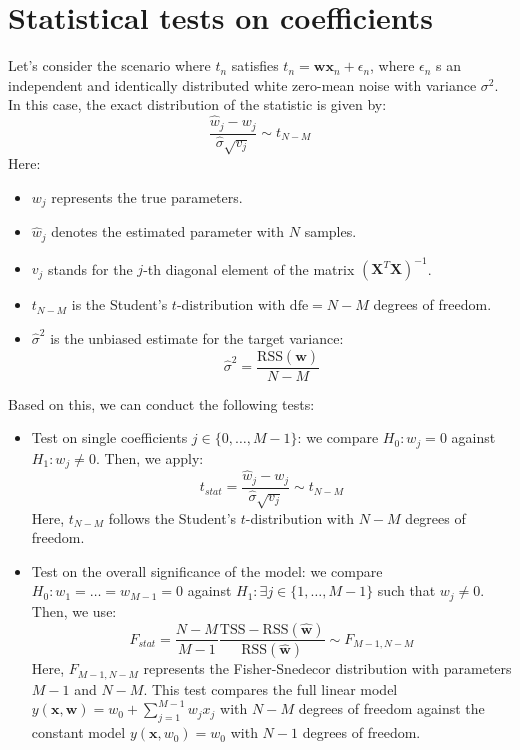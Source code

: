 \section{Statistical tests on coefficients}

Let's consider the scenario where $t_n$ satisfies $t_n=\textbf{w}\textbf{x}_n+\epsilon_n$, where $\epsilon_n$ s an independent and identically distributed white zero-mean noise with variance $\sigma^2$. 
In this case, the exact distribution of the statistic is given by:
\[\dfrac{\hat{w}_j-w_j}{\hat{\sigma}\sqrt{v_j}}\sim t_{N-M}\]
Here: 
\begin{itemize}
    \item $w_j$ represents the true parameters.
    \item $\hat{w}_j$ denotes the estimated parameter with $N$ samples.
    \item $v_j$ stands for the $j$-th diagonal element of the matrix $\left(\textbf{X}^T\textbf{X}\right)^{-1}$.
    \item $t_{N-M}$ is the Student's $t$-distribution with $\text{dfe}=N-M$ degrees of freedom.
    \item $\hat{\sigma}^2$ is the unbiased estimate for the target variance: 
        \[\hat{\sigma}^2=\dfrac{\text{RSS}(\hat{\textbf{w}})}{N-M}\]
\end{itemize}
Based on this, we can conduct the following tests:
\begin{itemize}
    \item Test on single coefficients $j \in \{0, \dots , M - 1\}$: we compare $H_0:w_j=0$ against $H_1:w_j\neq 0$. 
        Then, we apply:
        \[t_{stat}=\dfrac{\hat{w}_j-w_j}{\hat{\sigma}\sqrt{v_j}}\sim t_{N-M}\]
        Here, $t_{N-M}$ follows the Student's $t$-distribution with $N - M$ degrees of freedom.
    \item Test on the overall significance of the model: we compare $H_0:w_1=\dots=w_{M-1}=0$ against  $H_1:\exists j\in\{1,\dots,M-1\}$ such that $w_j \neq 0$. 
        Then, we use:
        \[F_{stat}=\dfrac{N-M}{M-1}\dfrac{\text{TSS}-\text{RSS}(\hat{\textbf{w}})}{\text{RSS}(\hat{\textbf{w}})}\sim F_{M-1,N-M}\]
        Here, $F_{M-1,N-M}$ represents the Fisher-Snedecor distribution with parameters $M - 1$ and $N - M$.
        This test compares the full linear model $y(\textbf{x},\textbf{w})=w_0+\sum_{j=1}^{M-1}w_jx_j$ with $N-M$ degrees of freedom against the constant model $y(\textbf{x},w_0)=w_0$ with $N - 1$ degrees of freedom. 
\end{itemize}